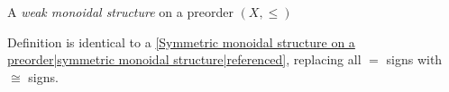 
A \emph{weak monoidal structure} on a preorder $(X, \leq)$

Definition is identical to a \ref{Symmetric monoidal structure on a preorder|symmetric monoidal structure|referenced}, replacing all $=$ signs with $\cong$ signs.
